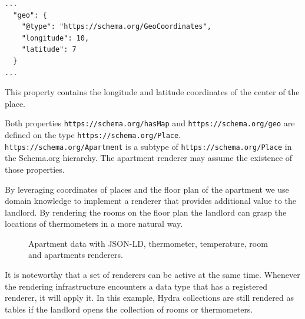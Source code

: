 \lstset{language=JSON}
\begin{lstlisting}[caption=The \lstinline{https://schema.org/geo} property of apartment \lstinline{/apartments/0}., label={lst:geo}]
...
  "geo": {
    "@type": "https://schema.org/GeoCoordinates",
    "longitude": 10,
    "latitude": 7
  }
...
\end{lstlisting}

This property contains the longitude and latitude coordinates of the center of the place.

Both properties \lstinline{https://schema.org/hasMap} and \lstinline{https://schema.org/geo} are defined on the type \lstinline{https://schema.org/Place}. \lstinline{https://schema.org/Apartment} is a subtype of \lstinline{https://schema.org/Place} in the Schema.org hierarchy. The apartment renderer may assume the existence of those properties.

By leveraging coordinates of places and the floor plan of the apartment we use domain knowledge to implement a renderer that provides additional value to the landlord. By rendering the rooms on the floor plan the landlord can grasp the locations of thermometers in a more natural way.

\begin{figure}[!htb]
  \caption{Apartment data with JSON-LD, thermometer, temperature, room and apartments renderers.}
  \label{fig:apartmentrenderer}
\end{figure}

It is noteworthy that a set of renderers can be active at the same time. Whenever the rendering infrastructure encounters a data type that has a registered renderer, it will apply it. In this example, Hydra collections are still rendered as tables if the landlord opens the collection of rooms or thermometers.

